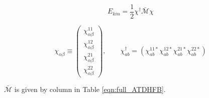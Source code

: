 \begin{equation}\label{eqn:kinetic_energy}
E_{kin} = \frac{1}{2}\chi^\dagger\mathcal{\bar{M}}\chi
\end{equation}


\begin{equation}
\chi_{\alpha\beta} \equiv \left(\begin{array}{c}
\chi_{\alpha\beta}^{11}\\
\chi_{\alpha\beta}^{12}\\
\chi_{\alpha\beta}^{21}\\
\chi_{\alpha\beta}^{22}
\end{array}\right), \qquad
\chi^\dagger_{ab} = \left(
\chi_{ab}^{11*} 
\chi_{ab}^{12*} 
\chi_{ab}^{21*} 
\chi_{ab}^{22*} 
\right)
\end{equation}

$\mathcal{\bar{M}}$ is given by column in Table \ref{eqn:full_ATDHFB}.

